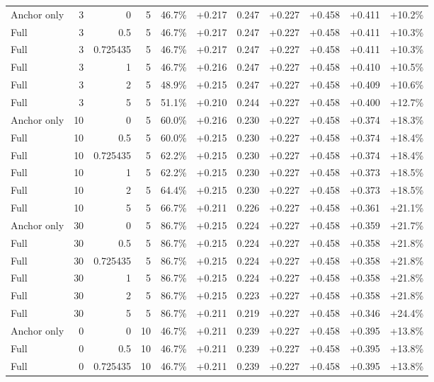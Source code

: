\begin{table}[htbp]
\begin{tabular}{lrrrccccccc}
Anchor only & 3 & 0 & 5 & 46.7\% & +0.217 & 0.247 & +0.227 & +0.458 & +0.411 & +10.2\% \\
Full & 3 & 0.5 & 5 & 46.7\% & +0.217 & 0.247 & +0.227 & +0.458 & +0.411 & +10.3\% \\
Full & 3 & 0.725435 & 5 & 46.7\% & +0.217 & 0.247 & +0.227 & +0.458 & +0.411 & +10.3\% \\
Full & 3 & 1 & 5 & 46.7\% & +0.216 & 0.247 & +0.227 & +0.458 & +0.410 & +10.5\% \\
Full & 3 & 2 & 5 & 48.9\% & +0.215 & 0.247 & +0.227 & +0.458 & +0.409 & +10.6\% \\
Full & 3 & 5 & 5 & 51.1\% & +0.210 & 0.244 & +0.227 & +0.458 & +0.400 & +12.7\% \\
Anchor only & 10 & 0 & 5 & 60.0\% & +0.216 & 0.230 & +0.227 & +0.458 & +0.374 & +18.3\% \\
Full & 10 & 0.5 & 5 & 60.0\% & +0.215 & 0.230 & +0.227 & +0.458 & +0.374 & +18.4\% \\
Full & 10 & 0.725435 & 5 & 62.2\% & +0.215 & 0.230 & +0.227 & +0.458 & +0.374 & +18.4\% \\
Full & 10 & 1 & 5 & 62.2\% & +0.215 & 0.230 & +0.227 & +0.458 & +0.373 & +18.5\% \\
Full & 10 & 2 & 5 & 64.4\% & +0.215 & 0.230 & +0.227 & +0.458 & +0.373 & +18.5\% \\
Full & 10 & 5 & 5 & 66.7\% & +0.211 & 0.226 & +0.227 & +0.458 & +0.361 & +21.1\% \\
Anchor only & 30 & 0 & 5 & 86.7\% & +0.215 & 0.224 & +0.227 & +0.458 & +0.359 & +21.7\% \\
Full & 30 & 0.5 & 5 & 86.7\% & +0.215 & 0.224 & +0.227 & +0.458 & +0.358 & +21.8\% \\
Full & 30 & 0.725435 & 5 & 86.7\% & +0.215 & 0.224 & +0.227 & +0.458 & +0.358 & +21.8\% \\
Full & 30 & 1 & 5 & 86.7\% & +0.215 & 0.224 & +0.227 & +0.458 & +0.358 & +21.8\% \\
Full & 30 & 2 & 5 & 86.7\% & +0.215 & 0.223 & +0.227 & +0.458 & +0.358 & +21.8\% \\
Full & 30 & 5 & 5 & 86.7\% & +0.211 & 0.219 & +0.227 & +0.458 & +0.346 & +24.4\% \\
Anchor only & 0 & 0 & 10 & 46.7\% & +0.211 & 0.239 & +0.227 & +0.458 & +0.395 & +13.8\% \\
Full & 0 & 0.5 & 10 & 46.7\% & +0.211 & 0.239 & +0.227 & +0.458 & +0.395 & +13.8\% \\
Full & 0 & 0.725435 & 10 & 46.7\% & +0.211 & 0.239 & +0.227 & +0.458 & +0.395 & +13.8\% \\

\end{tabular}
\end{table}
